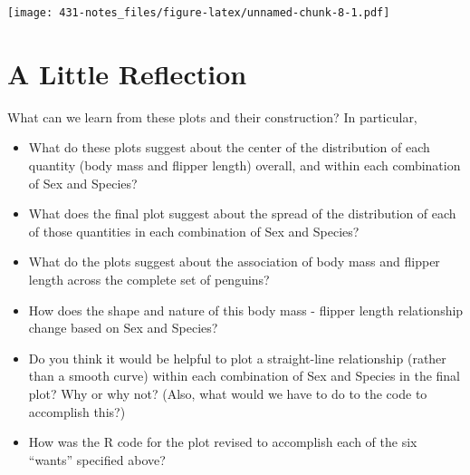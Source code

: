 \documentclass[
]{book}
\providecommand{\tightlist}{%
  \setlength{\itemsep}{0pt}\setlength{\parskip}{0pt}}
\begin{document}
\texttt{[image: 431-notes\_files/figure-latex/unnamed-chunk-8-1.pdf]}

\hypertarget{a-little-reflection}{%
\section{A Little Reflection}\label{a-little-reflection}}

What can we learn from these plots and their construction? In particular,

\begin{itemize}
\tightlist
\item
  What do these plots suggest about the center of the distribution of each quantity (body mass and flipper length) overall, and within each combination of Sex and Species?
\item
  What does the final plot suggest about the spread of the distribution of each of those quantities in each combination of Sex and Species?
\item
  What do the plots suggest about the association of body mass and flipper length across the complete set of penguins?
\item
  How does the shape and nature of this body mass - flipper length relationship change based on Sex and Species?
\item
  Do you think it would be helpful to plot a straight-line relationship (rather than a smooth curve) within each combination of Sex and Species in the final plot? Why or why not? (Also, what would we have to do to the code to accomplish this?)
\item
  How was the R code for the plot revised to accomplish each of the six ``wants'' specified above?
\end{itemize}

  
\end{document}

